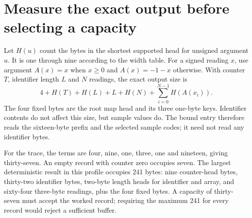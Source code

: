 \section{Measure the exact output before selecting a capacity}
Let $H(u)$ count the bytes in the shortest supported head for unsigned argument $u$.
It is one through nine according to the width table. For a signed reading $x$, use
argument $A(x)=x$ when $x\geq0$ and $A(x)=-1-x$ otherwise. With counter $T$, identifier
length $L$ and $N$ readings, the exact output size is
\[
  4+H(T)+H(L)+L+H(N)+\sum_{i=0}^{N-1}H(A(x_i)).
\]
The four fixed bytes are the root map head and its three one-byte keys. Identifier
contents do not affect this size, but sample values do. The bound entry therefore
reads the sixteen-byte prefix and the selected sample codes; it need not read any
identifier bytes.

For the trace, the terms are four, nine, one, three, one and nineteen, giving thirty-seven.
An empty record with counter zero occupies seven. The largest deterministic result in
this profile occupies 241 bytes: nine counter-head bytes, thirty-two identifier bytes,
two-byte length heads for identifier and array, and sixty-four three-byte readings,
plus the four fixed bytes. A capacity of thirty-seven must accept the worked record;
requiring the maximum 241 for every record would reject a sufficient buffer.
